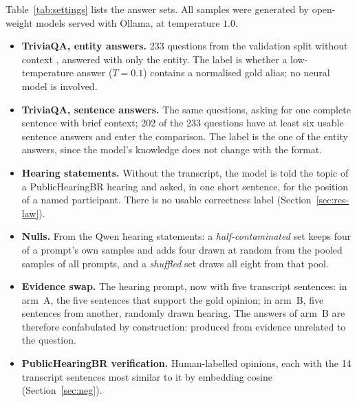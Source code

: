 \documentclass[english]{desafiokunumi}
\theoremstyle{definition}
\theoremstyle{remark}
\begin{document}
Table~\ref{tab:settings} lists the answer sets. All samples were generated by
open-weight models served with Ollama, at temperature $1.0$.

\begin{itemize}\setlength{\itemsep}{1pt}
  \item \textbf{TriviaQA, entity answers.} 233 questions from the validation
  split without context \citep{joshi2017triviaqa}, answered with only the
  entity. The label is whether a low-temperature answer ($T=0.1$) contains a
  normalised gold alias; no neural model is involved.
  \item \textbf{TriviaQA, sentence answers.} The same questions, asking for one
  complete sentence with brief context; 202 of the 233 questions have at least
  six usable sentence answers and enter the comparison. The label is the one
  of the entity answers, since the model's knowledge does not change with the
  format.
  \item \textbf{Hearing statements.} Without the transcript, the model is told
  the topic of a PublicHearingBR hearing \citep{publichearingbr} and asked, in
  one short sentence, for the position of a named participant. There is no
  usable correctness label (Section~\ref{sec:res-law}).
  \item \textbf{Nulls.} From the Qwen hearing statements: a
  \emph{half-contaminated} set keeps four of a prompt's own samples and adds
  four drawn at random from the pooled samples of all prompts, and a
  \emph{shuffled} set draws all eight from that pool.
  \item \textbf{Evidence swap.} The hearing prompt, now with five transcript
  sentences: in arm~A, the five sentences that support the gold opinion; in
  arm~B, five sentences from another, randomly drawn hearing. The answers of
  arm~B are therefore confabulated by construction: produced from evidence
  unrelated to the question.
  \item \textbf{PublicHearingBR verification.} Human-labelled opinions, each
  with the 14 transcript sentences most similar to it by embedding cosine
  \citep{reimers2019sbert} (Section~\ref{sec:neg}).
\end{itemize}
\end{document}
